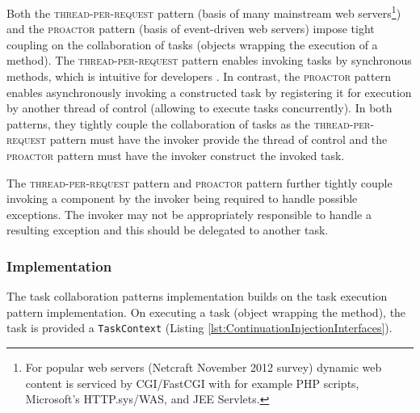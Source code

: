 \documentclass[prodmode]{style/acmlarge}
\begin{document}
Both the \textsc{thread-per-request} pattern \cite{thread-per-request} (basis of
many mainstream web servers\footnote{For popular web servers (Netcraft November
2012 survey) dynamic web content is serviced by CGI/FastCGI with for example PHP
scripts, Microsoft's HTTP.sys/WAS, and JEE Servlets.}) and the \textsc{proactor}
pattern \cite{proactor} (basis of event-driven web servers) impose tight
coupling on the collaboration of tasks (objects wrapping the execution of a
method).  The \textsc{thread-per-request} pattern enables invoking tasks by
synchronous methods, which is intuitive for developers \cite[p. 2]{proactor}.
In contrast, the \textsc{proactor} pattern enables asynchronously invoking a
constructed task by registering it for execution by another thread of control
(allowing to execute tasks concurrently).  In both patterns, they tightly couple
the collaboration of tasks as the \textsc{thread-per-request} pattern must have
the invoker provide the thread of control and the \textsc{proactor} pattern must
have the invoker construct the invoked task.

The \textsc{thread-per-request} pattern and \textsc{proactor} pattern further
tightly couple invoking a component by the invoker being required to handle
possible exceptions.  The invoker may not be appropriately responsible to handle
a resulting exception and this should be delegated to another task.


\subsubsection*{Implementation}

The task collaboration patterns implementation builds on the task execution
pattern implementation.  On executing a task (object wrapping the method), the
task is provided a \texttt{TaskContext} (Listing
\ref{lst:ContinuationInjectionInterfaces}).
\end{document}
